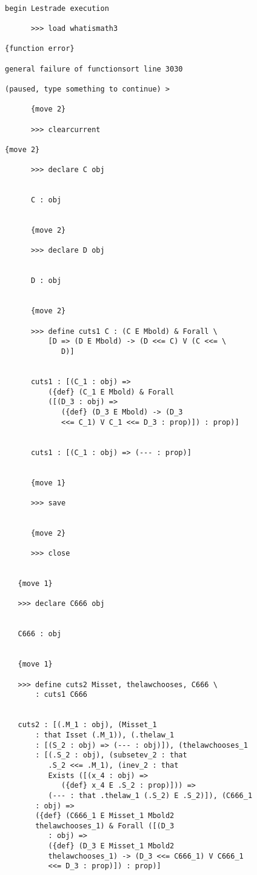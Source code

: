 \documentclass[12pt]{article}
\begin{document}
\begin{verbatim}

begin Lestrade execution

      >>> load whatismath3

{function error}

general failure of functionsort line 3030

(paused, type something to continue) >

      {move 2}

      >>> clearcurrent

{move 2}

      >>> declare C obj


      C : obj


      {move 2}

      >>> declare D obj


      D : obj


      {move 2}

      >>> define cuts1 C : (C E Mbold) & Forall \
          [D => (D E Mbold) -> (D <<= C) V (C <<= \
             D)]


      cuts1 : [(C_1 : obj) => 
          ({def} (C_1 E Mbold) & Forall 
          ([(D_3 : obj) => 
             ({def} (D_3 E Mbold) -> (D_3 
             <<= C_1) V C_1 <<= D_3 : prop)]) : prop)]


      cuts1 : [(C_1 : obj) => (--- : prop)]


      {move 1}

      >>> save


      {move 2}

      >>> close


   {move 1}

   >>> declare C666 obj


   C666 : obj


   {move 1}

   >>> define cuts2 Misset, thelawchooses, C666 \
       : cuts1 C666


   cuts2 : [(.M_1 : obj), (Misset_1 
       : that Isset (.M_1)), (.thelaw_1 
       : [(S_2 : obj) => (--- : obj)]), (thelawchooses_1 
       : [(.S_2 : obj), (subsetev_2 : that 
          .S_2 <<= .M_1), (inev_2 : that 
          Exists ([(x_4 : obj) => 
             ({def} x_4 E .S_2 : prop)])) => 
          (--- : that .thelaw_1 (.S_2) E .S_2)]), (C666_1 
       : obj) => 
       ({def} (C666_1 E Misset_1 Mbold2 
       thelawchooses_1) & Forall ([(D_3 
          : obj) => 
          ({def} (D_3 E Misset_1 Mbold2 
          thelawchooses_1) -> (D_3 <<= C666_1) V C666_1 
          <<= D_3 : prop)]) : prop)]



\end{verbatim}
\end{document}

